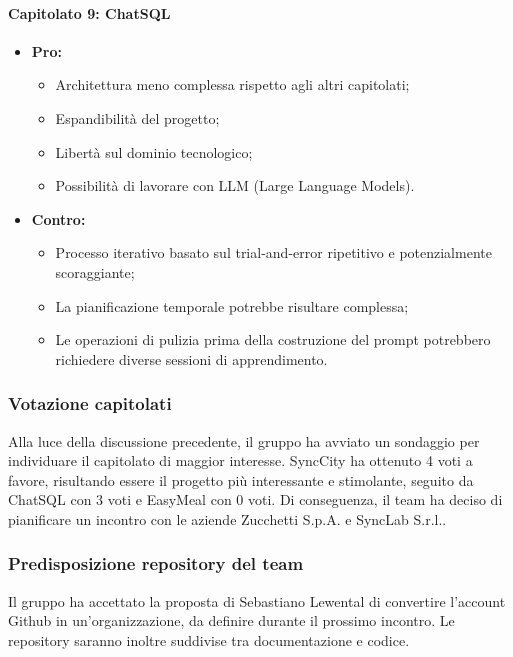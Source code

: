 \paragraph{Capitolato 9: ChatSQL}
\begin{itemize}
	\item \textbf{Pro:}
	\begin{itemize}
		\item Architettura meno complessa rispetto agli altri capitolati;
		\item Espandibilità del progetto;
		\item Libertà sul dominio tecnologico;
		\item Possibilità di lavorare con LLM (Large Language Models).
	\end{itemize}
	\item \textbf{Contro:}
	\begin{itemize}
		\item Processo iterativo basato sul trial-and-error ripetitivo e potenzialmente scoraggiante;
		\item La pianificazione temporale potrebbe risultare complessa;
		\item Le operazioni di pulizia prima della costruzione del prompt potrebbero richiedere diverse sessioni di apprendimento.	
	\end{itemize}
\end{itemize}

\subsubsection{Votazione capitolati}
Alla luce della discussione precedente, il gruppo ha avviato un sondaggio per individuare il capitolato di maggior interesse. SyncCity ha ottenuto 4 voti a favore, risultando essere il progetto più interessante e stimolante, seguito da ChatSQL con 3 voti e EasyMeal con 0 voti. Di conseguenza, il team ha deciso di pianificare un incontro con le aziende Zucchetti S.p.A. e SyncLab S.r.l..

\subsubsection{Predisposizione repository del team}
Il gruppo ha accettato la proposta di Sebastiano Lewental di convertire l’account Github in un’organizzazione, da definire durante il prossimo incontro. Le repository saranno inoltre suddivise tra documentazione e codice.

\clearpage
